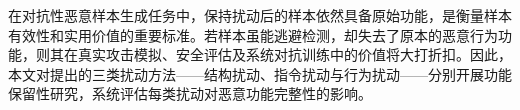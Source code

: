 在对抗性恶意样本生成任务中，保持扰动后的样本依然具备原始功能，是衡量样本有效性和实用价值的重要标准。若样本虽能逃避检测，却失去了原本的恶意行为功能，则其在真实攻击模拟、安全评估及系统对抗训练中的价值将大打折扣。因此，本文对提出的三类扰动方法——结构扰动、指令扰动与行为扰动——分别开展功能保留性研究，系统评估每类扰动对恶意功能完整性的影响。


